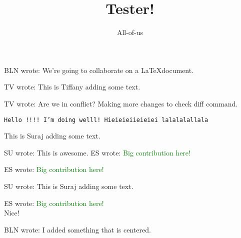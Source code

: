 \documentclass[12pt]{article}
\title{Tester!}
\author{All-of-us}
\newcommand{\bln}[1]{BLN wrote: \textcolor{red!70!blue!70}{#1}}
\newcommand{\tv}[1]{TV wrote: \textcolor{blue!70}{#1}}
\newcommand{\su}[1]{SU wrote: \textcolor{green!70}{#1}}
\newcommand{\es}[1]{ES wrote: \textcolor{green}{#1}}
\begin{document}
\maketitle

\bln{We're going to collaborate on a \LaTeX document.}

\tv{This is Tiffany adding some text.}

\tv{Are we in conflict? Making more changes to check diff command.}

\tt Hello !!!! I'm doing welll!
Hieieieiieieiei
lalalalallala


{This is Suraj adding some text.}

\su{This is awesome.}
\es{Big contribution here!}




\es{Big contribution here!}


\su{This is Suraj adding some text.}

\es{Big contribution here!}\\
{Nice!}


\begin{center}
  \bln{I added something that is centered.}
\end{center}
\end{document}

